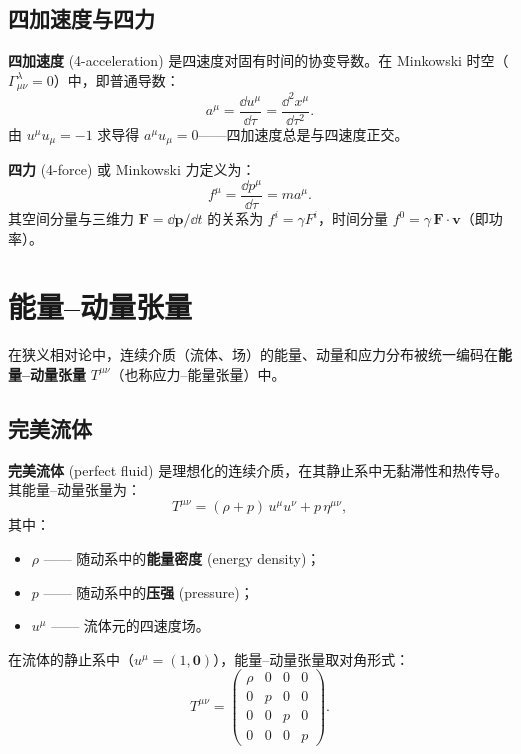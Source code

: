 \subsection{四加速度与四力}

\begin{definition}[四加速度]
\textbf{四加速度} (4-acceleration) 是四速度对固有时间的协变导数。在 Minkowski 时空（$\Gamma^\lambda_{\mu\nu} = 0$）中，即普通导数：
\begin{equation}
    a^\mu = \frac{\dd u^\mu}{\dd\tau} = \frac{\dd^2 x^\mu}{\dd\tau^2}.
\end{equation}
由 $u^\mu u_\mu = -1$ 求导得 $a^\mu u_\mu = 0$——四加速度总是与四速度正交。
\end{definition}

\begin{definition}[四力]
\textbf{四力} (4-force) 或 Minkowski 力定义为：
\begin{equation}
    f^\mu = \frac{\dd p^\mu}{\dd\tau} = m a^\mu.
\end{equation}
其空间分量与三维力 $\mathbf{F} = \dd\mathbf{p}/\dd t$ 的关系为 $f^i = \gamma F^i$，时间分量 $f^0 = \gamma\,\mathbf{F}\cdot\mathbf{v}$（即功率）。
\end{definition}

\section{能量--动量张量}

在狭义相对论中，连续介质（流体、场）的能量、动量和应力分布被统一编码在\textbf{能量--动量张量} $T^{\mu\nu}$（也称应力--能量张量）中。

\subsection{完美流体}

\begin{definition}
\textbf{完美流体} (perfect fluid) 是理想化的连续介质，在其静止系中无黏滞性和热传导。其能量--动量张量为：
\begin{equation}\label{eq:perfect_fluid}
    \boxed{T^{\mu\nu} = (\rho + p)\,u^\mu u^\nu + p\,\eta^{\mu\nu}},
\end{equation}
其中：
\begin{itemize}
    \item $\rho$ —— 随动系中的\textbf{能量密度} (energy density)；
    \item $p$ —— 随动系中的\textbf{压强} (pressure)；
    \item $u^\mu$ —— 流体元的四速度场。
\end{itemize}
在流体的静止系中（$u^\mu = (1, \mathbf{0})$），能量--动量张量取对角形式：
\begin{equation}
    T^{\mu\nu} = \begin{pmatrix}
        \rho & 0 & 0 & 0 \\
        0 & p & 0 & 0 \\
        0 & 0 & p & 0 \\
        0 & 0 & 0 & p
    \end{pmatrix}.
\end{equation}
\end{definition}

